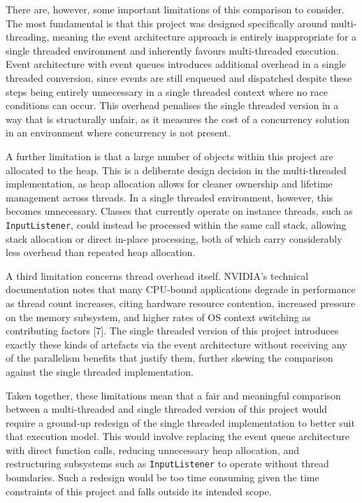 \documentclass[]{final_report}
\begin{document}
There are, however, some important limitations of this comparison to consider. 
The most fundamental is that this project was designed specifically around 
multi-threading, meaning the event architecture approach is entirely 
inappropriate for a single threaded environment and inherently favours 
multi-threaded execution. Event architecture with event queues introduces 
additional overhead in a single threaded conversion, since events are still 
enqueued and dispatched despite these steps being entirely unnecessary in a 
single threaded context where no race conditions can occur. This overhead 
penalises the single threaded version in a way that is structurally unfair, as 
it measures the cost of a concurrency solution in an environment where 
concurrency is not present.

A further limitation is that a large number of objects within this project are 
allocated to the heap. This is a deliberate design decision in the multi-threaded 
implementation, as heap allocation allows for cleaner ownership and lifetime 
management across threads. In a single threaded environment, however, this 
becomes unnecessary. Classes that currently operate on instance threads, such as 
\texttt{InputListener}, could instead be processed within the same call stack, 
allowing stack allocation or direct in-place processing, both of which carry 
considerably less overhead than repeated heap allocation.

A third limitation concerns thread overhead itself. NVIDIA's technical 
documentation notes that many CPU-bound applications degrade in performance as 
thread count increases, citing hardware resource contention, increased pressure 
on the memory subsystem, and higher rates of OS context switching as contributing 
factors [7]. The single threaded version of this project 
introduces exactly these kinds of artefacts via the event architecture without 
receiving any of the parallelism benefits that justify them, further skewing the 
comparison against the single threaded implementation.

Taken together, these limitations mean that a fair and meaningful comparison 
between a multi-threaded and single threaded version of this project would 
require a ground-up redesign of the single threaded implementation to better 
suit that execution model. This would involve replacing the event queue 
architecture with direct function calls, reducing unnecessary heap allocation, 
and restructuring subsystems such as \texttt{InputListener} to operate without 
thread boundaries. Such a redesign would be too time consuming given the time 
constraints of this project and falls outside its intended scope.
\end{document}
